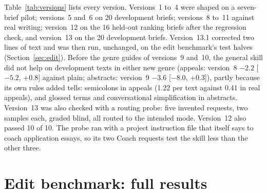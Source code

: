 \documentclass[11pt]{article}
\begin{document}
Table~\ref{tab:versions} lists every version. Versions~1 to~4 were shaped on a seven-brief pilot; versions~5 and~6 on 20 development briefs; versions~8 to~11 against real writing; version~12 on the 16 held-out ranking briefs after the regression check, and version~13 on the 20 development briefs. Version~13.1 corrected two lines of text and was then run, unchanged, on the edit benchmark's test halves (Section~\ref{sec:edit}). Before the genre guides of versions~9 and~10, the general skill did not help on development texts in either new genre (appeals: version~8 $-2.2$ [$-5.2$, +0.8] against plain; abstracts: version~9 $-3.6$ [$-8.0$, +0.3]), partly because its own rules added tells: semicolons in appeals (1.22 per text against 0.41 in real appeals), and glossed terms and conversational simplification in abstracts. Version~13 was also checked with a routing probe: five invented requests, two samples each, graded blind, all routed to the intended mode. Version~12 also passed 10 of 10. The probe ran with a project instruction file that itself says to coach application essays, so its two Coach requests test the skill less than the other three.

\FloatBarrier
\section{Edit benchmark: full results}
\label{sec:appendix-edit}
\end{document}
